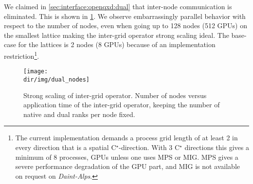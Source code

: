 We claimed in \cref{sec:interface:openqxd:dual} that inter-node communication is eliminated.
This is shown in \cref{fig:dual:nodes}.
We observe embarrassingly parallel behavior with respect to the number of nodes, even when going up to \num{128} nodes (\num{512} GPUs) on the smallest lattice making the inter-grid operator strong scaling ideal.
The base-case for the \Cstar lattices is \num{2} nodes (\num{8} GPUs) because of an implementation restriction\footnote{The current implementation demands a process grid length of at least 2 in every direction that is a spatial C$^\star$-direction. With 3 C$^\star$ directions this gives a minimum of 8 processes,  GPUs unless one uses MPS or MIG. MPS gives a severe performance degradation of the GPU part, and MIG is not available on request on \emph{Daint-Alps}.}.
\begin{figure}
    \centering
    \texttt{[image: \\dir/img/dual\_nodes]}
    \caption{Strong scaling of inter-grid operator. Number of nodes versus application time of the inter-grid operator, keeping the number of native and dual ranks per node fixed. }
    \label{fig:dual:nodes}
\end{figure}

